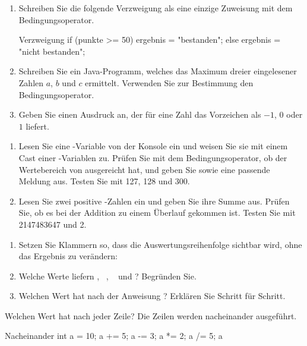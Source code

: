 \begin{enumerate}[label=\alph*)]
\item Schreiben Sie die folgende Verzweigung als eine einzige Zuweisung mit dem Bedingungsoperator.
\begin{javacode}[Ausschnitt]{Verzweigung}
if (punkte >= 50) {
	ergebnis = "bestanden";
} else {
	ergebnis = "nicht bestanden";
}
\end{javacode}
\item Schreiben Sie ein Java-Programm, welches das Maximum dreier eingelesener Zahlen $a$, $b$ und $c$ ermittelt. Verwenden Sie zur Bestimmung den Bedingungsoperator.
\item Geben Sie einen Ausdruck an, der für eine Zahl  das Vorzeichen als $-1$, $0$ oder $1$ liefert.
\end{enumerate}

\begin{enumerate}[label=\alph*)]
\item Lesen Sie eine -Variable  von der Konsole ein und weisen Sie sie mit einem Cast einer -Variablen  zu. Prüfen Sie mit dem Bedingungsoperator, ob der Wertebereich von  ausgereicht hat, und geben Sie  sowie eine passende Meldung aus. Testen Sie mit 127, 128 und 300.
\item Lesen Sie zwei positive -Zahlen ein und geben Sie ihre Summe aus. Prüfen Sie, ob es bei der Addition zu einem Überlauf gekommen ist. Testen Sie mit 2147483647 und 2.
\end{enumerate}

\begin{enumerate}[label=\alph*)]
\item Setzen Sie Klammern so, dass die Auswertungsreihenfolge sichtbar wird, ohne das Ergebnis zu verändern: \\
 \qquad\qquad {} \qquad\qquad {}
\item Welche Werte liefern , \ , \  und ? Begründen Sie.
\item Welchen Wert hat  nach der Anweisung ? Erklären Sie Schritt für Schritt.
\end{enumerate}

\ueben
{}
Welchen Wert hat  nach jeder Zeile? Die Zeilen werden nacheinander ausgeführt.
\begin{javacode}[Ausschnitt]{Nacheinander}
int a = 10;
a += 5;
a -= 3;
a *= 2;
a /= 5;
a %
\end{javacode}

